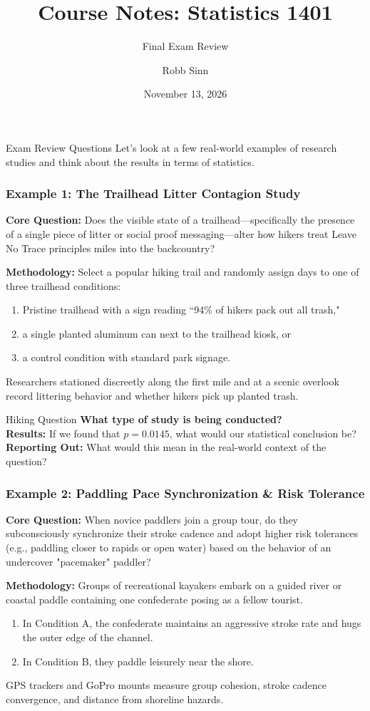 \documentclass{beamer}
\title{Course Notes: Statistics 1401}
\subtitle{Final Exam Review}
\author{Robb Sinn}
\date{November 13, 2026}
\begin{document}
\frame{\titlepage}
\begin{frame}{Exam Review Questions}
Let's look at a few real-world examples of research studies and think about the results in terms of statistics.    
\end{frame}

\begin{frame}\frametitle{Example 1: The Trailhead Litter Contagion Study}
\textbf{Core Question:} Does the visible state of a trailhead—specifically the presence of a single piece of litter or social proof messaging—alter how hikers treat Leave No Trace principles miles into the backcountry?

\textbf{Methodology:} Select a popular hiking trail and randomly assign days to one of three trailhead conditions:
\begin{enumerate}
    \item Pristine trailhead with a sign reading ``94\% of hikers pack out all trash,"
    \item a single planted aluminum can next to the trailhead kiosk, or 
    \item a control condition with standard park signage.
\end{enumerate} Researchers stationed discreetly along the first mile and at a scenic overlook record littering behavior and whether hikers pick up planted trash.
\end{frame}

\begin{frame}{Hiking Question}
\textbf{What type of study is being conducted?}\\[9mm]
\pause
\textbf{Results:} If we found that $p = 0.0145$, what would our statistical conclusion be?\\[9mm]
\pause
\textbf{Reporting Out:} What would this mean in the real-world context of the question? 
\vspace{25mm}
\end{frame}

\begin{frame}\frametitle{Example 2: Paddling Pace Synchronization & Risk Tolerance}
\textbf{Core Question:} When novice paddlers join a group tour, do they subconsciously synchronize their stroke cadence and adopt higher risk tolerances (e.g., paddling closer to rapids or open water) based on the behavior of an undercover "pacemaker" paddler?

\textbf{Methodology:} Groups of recreational kayakers embark on a guided river or coastal paddle containing one confederate posing as a fellow tourist. 

\begin{enumerate}
    \item In Condition A, the confederate maintains an aggressive stroke rate and hugs the outer edge of the channel. 
    \item In Condition B, they paddle leisurely near the shore.
\end{enumerate} 
GPS trackers and GoPro mounts measure group cohesion, stroke cadence convergence, and distance from shoreline hazards.
\end{frame}
\end{document}
